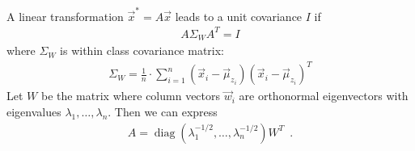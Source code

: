 \documentclass[landscape,footrule]{foils}
\DeclareMathOperator{\diag}{diag}
\begin{document}

A linear transformation $\vec{x}^*=A\vec{x}$ leads to a unit covariance $I$ if 
\begin{align*}
A\Sigma_W A^T=I
\end{align*}  
where $\Sigma_W$ is within class covariance matrix:
\begin{align*}
\Sigma_W=\frac{1}{n}\cdot \sum_{i=1}^n (\vec{x}_i-\vec{\mu}_{z_i})(\vec{x}_i-\vec{\mu}_{z_i})^T
\end{align*}
Let $W$ be the matrix where column vectors $\vec{w}_i$ are orthonormal eigenvectors with eigenvalues $\lambda_1,\ldots,\lambda_n$. Then we can express 
\begin{align*}
A=\diag(\lambda_1^{-1/2},\ldots,\lambda_n^{-1/2})W^T\enspace. 
\end{align*} 

\end{document}
